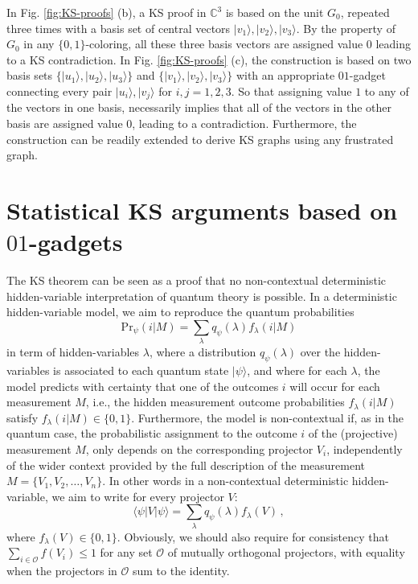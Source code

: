 \documentclass[twocolumn, a4paper, superscriptaddress,nofootinbib, accepted=2020-08-07, hyperref]{quantumarticle}
\begin{document}
In Fig. \ref{fig:KS-proofs} (b), a KS proof in $\mathbb{C}^3$ is based on the unit $G_0$, repeated three times with a basis set of central vectors $|v_1 \rangle, |v_2 \rangle, |v_3 \rangle$. By the property of $G_0$ in any $\{0,1\}$-coloring, all these three basis vectors are assigned value $0$ leading to a KS contradiction.
 In Fig. \ref{fig:KS-proofs} (c), the construction is based on two basis sets $\{|u_1 \rangle, |u_2 \rangle, |u_3 \rangle\}$ and $\{|v_1 \rangle, |v_2 \rangle, |v_3 \rangle\}$ with an appropriate $01$-gadget connecting every pair $|u_i \rangle, |v_j \rangle$ for $i, j =1, 2, 3$. So that assigning value $1$ to any of the vectors in one basis, necessarily implies that all of the vectors in the other basis are assigned value $0$, leading to a contradiction. Furthermore, the construction can be readily extended to derive KS graphs using any frustrated graph. 




\section{Statistical KS arguments based on $01$-gadgets}\label{sec:real}
The KS theorem can be seen as a proof that no non-contextual deterministic hidden-variable interpretation of quantum theory is possible. In a deterministic hidden-variable model, we aim to reproduce the quantum probabilities
\begin{equation}
\text{Pr}_{\psi}(i|M)=\sum_\lambda q_{\psi}(\lambda) f_\lambda(i|M)
\end{equation}
in term of hidden-variables $\lambda$, where a distribution $q_{\psi}(\lambda)$ over the hidden-variables is associated to each quantum state $|\psi\rangle$, and where for each $\lambda$, the model predicts with certainty that one of the outcomes $i$ will occur for each measurement $M$, i.e., the hidden measurement outcome probabilities $f_\lambda(i|M)$ satisfy $f_\lambda(i|M)\in\{0,1\}$. Furthermore, the model is non-contextual if, as in the quantum case, the probabilistic assignment to the outcome $i$ of the (projective) measurement $M$, only depends on the corresponding projector $V_i$, independently of the wider context provided by the full description of the measurement $M=\{V_1,V_2,\ldots,V_n\}$. In other words in a non-contextual deterministic hidden-variable, we aim to write for every projector $V$:
\begin{equation}
\langle\psi|V|\psi\rangle=\sum_\lambda q_{\psi}(\lambda) f_\lambda(V)\,,
\end{equation}
where $f_\lambda(V)\in\{0,1\}$. Obviously, we should also require for consistency that $\sum_{i\in \mathcal{O}}f(V_i)\leq 1$ for any set $\mathcal{O}$ of mutually orthogonal projectors, with equality when the projectors in $\mathcal{O}$ sum to the identity. 
\end{document}

